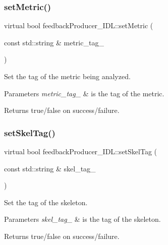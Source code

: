 \subsubsection{\texorpdfstring{setMetric()}{setMetric()}}
{\footnotesize\ttfamily virtual bool feedback\+Producer\+\_\+\+I\+D\+L\+::set\+Metric (\begin{DoxyParamCaption}\item[{const std\+::string \&}]{metric\+\_\+tag\+\_\+ }\end{DoxyParamCaption})\hspace{0.3cm}{\ttfamily [virtual]}}



Set the tag of the metric being analyzed. 


\begin{DoxyParams}{Parameters}
{\em metric\+\_\+tag\+\_\+} & is the tag of the metric. \\
\hline
\end{DoxyParams}
\begin{DoxyReturn}{Returns}
true/false on success/failure. 
\end{DoxyReturn}
\mbox{\label{classfeedbackProducer__IDL_a415d86e692f8bb4987229f17ca0d90a5}} 
\subsubsection{\texorpdfstring{setSkelTag()}{setSkelTag()}}
{\footnotesize\ttfamily virtual bool feedback\+Producer\+\_\+\+I\+D\+L\+::set\+Skel\+Tag (\begin{DoxyParamCaption}\item[{const std\+::string \&}]{skel\+\_\+tag\+\_\+ }\end{DoxyParamCaption})\hspace{0.3cm}{\ttfamily [virtual]}}



Set the tag of the skeleton. 


\begin{DoxyParams}{Parameters}
{\em skel\+\_\+tag\+\_\+} & is the tag of the skeleton. \\
\hline
\end{DoxyParams}
\begin{DoxyReturn}{Returns}
true/false on success/failure. 
\end{DoxyReturn}
\mbox{\label{classfeedbackProducer__IDL_a029ad9dc9918e229624d0dac6f6ca42e}} 
